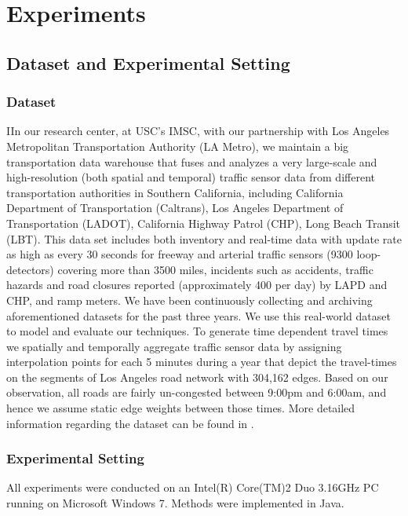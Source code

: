 \section{Experiments}
\label{sec:experiments}
\subsection{Dataset and Experimental Setting}
\subsubsection{Dataset}
\label{subsec:Dataset}
IIn our research center, at USC's IMSC, with our partnership with Los Angeles Metropolitan Transportation Authority (LA Metro), we maintain a big transportation data warehouse that fuses and analyzes a very large-scale and high-resolution (both spatial and temporal) traffic sensor data from different transportation authorities in Southern California, including California Department of Transportation (Caltrans), Los Angeles Department of Transportation (LADOT), California Highway Patrol (CHP), Long Beach Transit (LBT).  This data set includes both inventory and real-time data with update rate as high as every 30 seconds for freeway and arterial traffic sensors (9300 loop-detectors) covering more than 3500 miles, incidents  such as accidents, traffic hazards and road closures reported (approximately 400 per day) by LAPD and CHP, and ramp meters. We have been continuously collecting and archiving aforementioned datasets for the past three years. We use this real-world dataset to model and evaluate our techniques. To generate time dependent  travel times we spatially and temporally aggregate traffic sensor data by assigning interpolation points for each 5 minutes during a year that depict the travel-times on the segments of Los Angeles road network with 304,162 edges. Based on our observation, all roads are fairly un-congested between 9:00pm and 6:00am, and hence we assume static edge weights between those times. More detailed information regarding the dataset can be found in \cite{Jagadish14}.

\subsubsection{Experimental Setting}
All experiments were conducted on an Intel(R) Core(TM)2 Duo 3.16GHz PC running on Microsoft Windows 7. Methods were implemented in Java.

